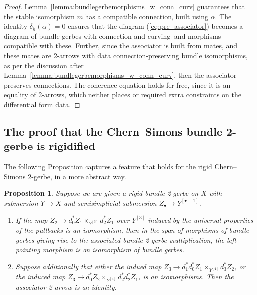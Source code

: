 \documentclass[12pt]{amsart}
\theoremstyle{plain}
\newtheorem{proposition}[theorem]{Proposition}
\theoremstyle{definition}
\theoremstyle{remark}
\numberwithin{equation}{section}
\newcommand{\<}{\langle}
\renewcommand{\>}{\rangle}
\begin{document}
\begin{proof}
Lemma~\ref{lemma:bundlegerbemorphisms_w_conn_curv} guarantees that the stable isomorphism $\overline{m}$ has a compatible connection, built using $\alpha$.
The identity $\delta_h(\alpha)=0$ ensures that the diagram (\ref{eq:pre_associator}) becomes a diagram of bundle gerbes with connection and curving, and morphisms compatible with these.
Further, since the associator is built from mates, and these mates are 2-arrows with data connection-preserving bundle isomorphisms, as per the discussion after Lemma~\ref{lemma:bundlegerbemorphisms_w_conn_curv}, then the associator preserves connections.
The coherence equation holds for free, since it is an equality of 2-arrows, which neither places or required extra constraints on the differential form data.
\end{proof}


\subsection{The proof that the Chern--Simons bundle 2-gerbe is rigidified}\label{subsec:CS2-gerbe_rigidified}



The following Proposition captures a feature that holds for the rigid Chern--Simons 2-gerbe, in a more abstract way.

\begin{proposition}\label{prop:general_strictification_setup}
Suppose we are given a rigid bundle 2-gerbe on $X$ with submersion $Y\to X$ and semisimplicial submersion $Z_\bullet\to Y^{[\bullet+1]}$.
\begin{enumerate}
 \item If the map $Z_2\to d_0^* Z_1\times_{Y^{[3]}} d_2^*Z_1$ over $Y^{[3]}$ induced by the universal properties of the pullbacks is an isomorphism, then in the span of morphisms of bundle gerbes giving rise to the associated bundle 2-gerbe multiplication, the left-pointing morphism is an \emph{isomorphism} of bundle gerbes. 


 \item Suppose additionally that either the indued map $Z_3 \to d_1^*d_0^*Z_1 \times_{Y^{[4]}}d_3^*Z_2$, or the induced map $Z_3 \to d_0^*Z_2 \times_{Y^{[4]}} d_2^*d_2^* Z_1$, is an isomorphisms. Then the associator 2-arrow is an identity.
 \end{enumerate} 

\end{proposition}
\end{document}
